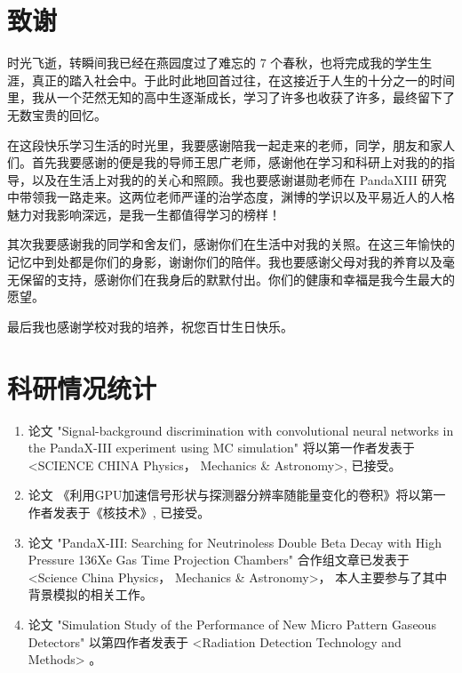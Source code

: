 
\chapter{致谢}

时光飞逝，转瞬间我已经在燕园度过了难忘的 7 个春秋，也将完成我的学生生涯，真正的踏入社会中。于此时此地回首过往，在这接近于人生的十分之一的时间里，我从一个茫然无知的高中生逐渐成长，学习了许多也收获了许多，最终留下了无数宝贵的回忆。

在这段快乐学习生活的时光里，我要感谢陪我一起走来的老师，同学，朋友和家人们。首先我要感谢的便是我的导师王思广老师，感谢他在学习和科研上对我的的指导，以及在生活上对我的的关心和照顾。我也要感谢谌勋老师在 PandaXIII 研究中带领我一路走来。这两位老师严谨的治学态度，渊博的学识以及平易近人的人格魅力对我影响深远，是我一生都值得学习的榜样！

其次我要感谢我的同学和舍友们，感谢你们在生活中对我的关照。在这三年愉快的记忆中到处都是你们的身影，谢谢你们的陪伴。我也要感谢父母对我的养育以及毫无保留的支持，感谢你们在我身后的默默付出。你们的健康和幸福是我今生最大的愿望。

最后我也感谢学校对我的培养，祝您百廿生日快乐。

\chapter{科研情况统计}

\begin{enumerate}
\item 论文 "Signal-background discrimination with convolutional neural networks in the PandaX-III experiment using MC simulation" 将以第一作者发表于 <SCIENCE CHINA Physics， Mechanics \& Astronomy>, 已接受。
\item 论文 《利用GPU加速信号形状与探测器分辨率随能量变化的卷积》将以第一作者发表于《核技术》, 已接受。
\item 论文 "PandaX-III: Searching for Neutrinoless Double Beta Decay with High Pressure 136Xe Gas Time Projection Chambers" 合作组文章已发表于 <Science China Physics， Mechanics \& Astronomy>， 本人主要参与了其中背景模拟的相关工作。
\item 论文 "Simulation Study of the Performance of New Micro Pattern Gaseous Detectors" 以第四作者发表于 <Radiation Detection Technology and Methods> 。
\end{enumerate}